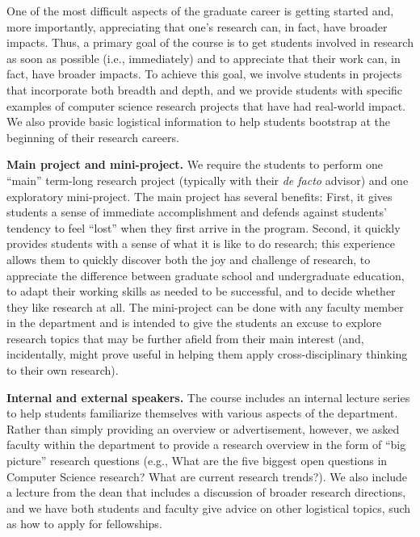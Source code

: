 One of the most difficult aspects of the graduate career is getting
started and, more importantly, appreciating that one's research can, in
fact, have broader impacts.  Thus, a primary goal of the course is to
get students involved in research as soon as possible (i.e.,
immediately) and to appreciate that their work can, in fact, have
broader impacts.  To achieve this goal, we involve students in projects
that incorporate both breadth and depth, and we provide students with
specific examples of computer science research projects that have had
real-world impact.  We also provide basic logistical information to help
students bootstrap at the beginning of their research careers.

\vspace*{0.1in}
\noindent
{\bf Main project and mini-project.}  We require the students to perform
one ``main'' term-long research project (typically with their {\em de
  facto} advisor) and one exploratory mini-project.  The main project
has several benefits: First, it gives students a sense of immediate
accomplishment and defends against students' tendency to feel ``lost''
when they first arrive in the program.  Second, it quickly provides
students with a sense of what it is like to do research; this experience
allows them to quickly discover both the joy and challenge of research,
to appreciate the difference between graduate school and undergraduate
education, to adapt their working skills as needed to be successful, and
to decide whether they like research at all.  The mini-project can be
done with any faculty member in the department and is intended to give
the students an excuse to explore research topics that may be further
afield from their main interest (and, incidentally, might prove useful
in helping them apply cross-disciplinary thinking to their own
research). 

\vspace*{0.1in}
\noindent
{\bf Internal and external speakers.}  The course includes an internal
lecture series to help students familiarize themselves with various
aspects of the department.  Rather than simply providing an overview or
advertisement, however, we asked faculty within the department to
provide a research overview in the form of ``big picture'' research
questions (e.g., What are the five biggest open questions in Computer
Science research? What are current research trends?).  We also include a
lecture from the dean that includes a discussion of broader research
directions, and we have both students and faculty give advice on other
logistical topics, such as how to apply for fellowships.


